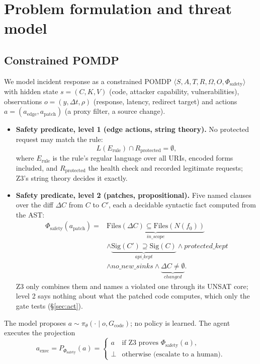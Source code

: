 \documentclass[journal]{IEEEtran}
\newcommand{\phisafe}{\ensuremath{\Phi_{\mathrm{safety}}}}
\begin{document}
\section{Problem formulation and threat model}

\subsection{Constrained POMDP}
We model incident response as a constrained POMDP $\langle S, A, T, R, \Omega, O, \phisafe \rangle$ with hidden state $s = (C, K, V)$ (code, attacker capability, vulnerabilities), observations $o = (y, \Delta t, \rho)$ (response, latency, redirect target) and actions $a = (a_{\mathrm{edge}}, a_{\mathrm{patch}})$ (a proxy filter, a source change).
\begin{itemize}
\item \textbf{Safety predicate, level 1 (edge actions, string theory).} No protected request may match the rule:
\begin{equation}
L(E_{\mathrm{rule}}) \cap R_{\mathrm{protected}} = \emptyset,
\end{equation}
where $E_{\mathrm{rule}}$ is the rule's regular language over all URIs, encoded forms included, and $R_{\mathrm{protected}}$ the health check and recorded legitimate requests; Z3's string theory decides it exactly.
\item \textbf{Safety predicate, level 2 (patches, propositional).} Five named clauses over the diff $\Delta C$ from $C$ to $C'$, each a decidable syntactic fact computed from the AST:
\begin{equation}
\begin{split}
\phisafe(a_{\mathrm{patch}}) = {} & \underbrace{\mathrm{Files}(\Delta C) \subseteq \mathrm{Files}(N(f_0))}_{\mathit{in\_scope}}\\
& \wedge \underbrace{\mathrm{Sig}(C') \supseteq \mathrm{Sig}(C)}_{\mathit{api\_kept}} \wedge \mathit{protected\_kept}\\
& \wedge \mathit{no\_new\_sinks} \wedge \underbrace{\Delta C \neq \emptyset}_{\mathit{changed}}.
\end{split}
\end{equation}
Z3 only combines them and names a violated one through its UNSAT core; level 2 says nothing about what the patched code computes, which only the gate tests (\S\ref{sec:act}).
\end{itemize}
The model proposes $a \sim \pi_\theta(\cdot \mid o, G_{\mathrm{code}})$; no policy is learned. The agent executes the projection
\begin{equation}
a_{\mathrm{exec}} = P_{\phisafe}(a) =
\begin{cases}
a & \text{if Z3 proves } \phisafe(a),\\
\bot & \text{otherwise (escalate to a human).}
\end{cases}
\end{equation}
\end{document}
